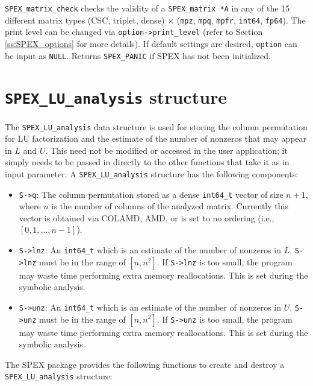 \documentclass[12pt]{report}
\theoremstyle{definition}
\begin{document}
\verb|SPEX_matrix_check| checks the validity of a \verb|SPEX_matrix *A| in any
of the 15 different matrix types (CSC, triplet, dense) $\times$ (\verb|mpz|,
\verb|mpq|, \verb|mpfr|, \verb|int64|, \verb|fp64|). The print level can be
changed via \verb|option->print_level| (refer to Section \ref{ss:SPEX_options}
for more details).  If default settings are desired, \verb|option| can be input
as \verb|NULL|.  Returns \verb|SPEX_PANIC| if SPEX has not been initialized.

\cprotect\section{\verb|SPEX_LU_analysis| structure}
\label{ss:SPEX_LU_analysis}

The \verb|SPEX_LU_analysis| data structure is used for storing the column
permutation for LU factorization and the estimate of the number of nonzeros
that may appear in $L$ and $U$.  This need not be modified or accessed in the
user application; it simply needs to be passed in directly to the other
functions that take it as in input parameter. A \verb|SPEX_LU_analysis|
structure has the following components:

\begin{itemize}
\item \verb|S->q|: The column permutation stored as a dense \verb|int64_t|
vector of size $n+1$, where $n$ is the number of columns of the analyzed matrix.
Currently this vector is obtained via COLAMD, AMD, or is set to no ordering
(i.e., $[0, 1, \hdots, n-1]$).

\item \verb|S->lnz|: An \verb|int64_t| which is an estimate of the number of
nonzeros in $L$. \verb|S->lnz| must be in the range of $[n, n^2]$. If
\verb|S->lnz| is too small, the program may waste time performing extra memory
reallocations. This is set during the symbolic analysis.

\item \verb|S->unz|: An \verb|int64_t| which is an estimate of the number of
nonzeros in $U$. \verb|S->unz| must be in the range of $[n, n^2]$. If
\verb|S->unz| is too small, the program may waste time performing extra memory
reallocations. This is set during the symbolic analysis.
\end{itemize}

The SPEX package provides the following functions to create and destroy a
\verb|SPEX_LU_analysis| structure:
\end{document}
